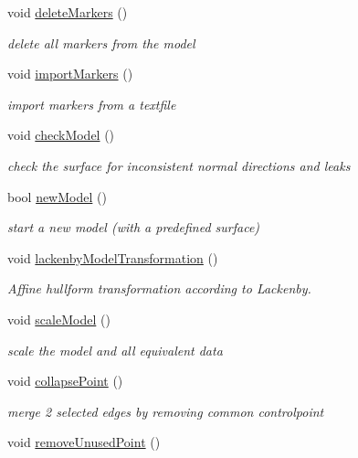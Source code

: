 \begin{DoxyCompactItemize}
void \hyperlink{classShipCAD_1_1Controller_ae9cce4c133abd067d98812eb342663d0}{delete\-Markers} ()
\begin{DoxyCompactList}\small\item\em delete all markers from the model \end{DoxyCompactList}\item 
void \hyperlink{classShipCAD_1_1Controller_a3f61864f54c59f0f4d9df19824eb387b}{import\-Markers} ()
\begin{DoxyCompactList}\small\item\em import markers from a textfile \end{DoxyCompactList}\item 
void \hyperlink{classShipCAD_1_1Controller_a8e6d827b35a5aa295fc455e64e458f84}{check\-Model} ()
\begin{DoxyCompactList}\small\item\em check the surface for inconsistent normal directions and leaks \end{DoxyCompactList}\item 
bool \hyperlink{classShipCAD_1_1Controller_a129f26196db49a371b747f9e58358b88}{new\-Model} ()
\begin{DoxyCompactList}\small\item\em start a new model (with a predefined surface) \end{DoxyCompactList}\item 
void \hyperlink{classShipCAD_1_1Controller_a1008c0cde2f16e883fbe6a07850ba670}{lackenby\-Model\-Transformation} ()
\begin{DoxyCompactList}\small\item\em Affine hullform transformation according to Lackenby. \end{DoxyCompactList}\item 
void \hyperlink{classShipCAD_1_1Controller_aca7415d01ad863a7dabc8260d9f868fe}{scale\-Model} ()
\begin{DoxyCompactList}\small\item\em scale the model and all equivalent data \end{DoxyCompactList}\item 
void \hyperlink{classShipCAD_1_1Controller_a014673c39abcced0285f8df64842918e}{collapse\-Point} ()
\begin{DoxyCompactList}\small\item\em merge 2 selected edges by removing common controlpoint \end{DoxyCompactList}\item 
void \hyperlink{classShipCAD_1_1Controller_a42d9eb4cf3864ca9057bfa45c1c80d40}{remove\-Unused\-Point} ()

\end{DoxyCompactItemize}
